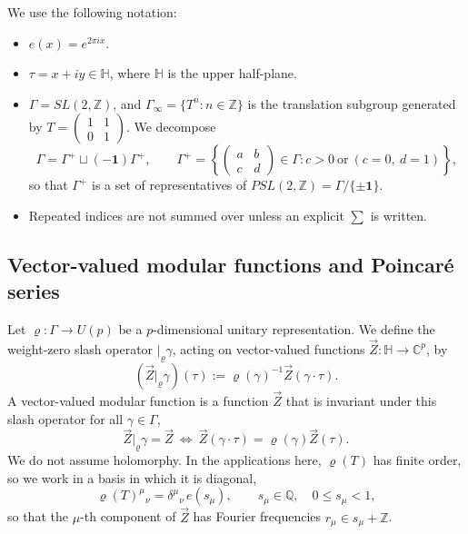 \documentclass[11pt]{article}
\numberwithin{equation}{section}
\begin{document}
We use the following notation:
\begin{itemize}
  \item $e(x)=e^{2\pi ix}$.
  \item $\tau=x+iy\in\mathbb H$, where $\mathbb H$ is the upper half-plane.
  \item $\Gamma=SL(2,\mathbb Z)$, and $\Gamma_\infty=\{T^n:n\in\mathbb Z\}$ is the
  translation subgroup generated by
  $T=\left(\begin{smallmatrix}1&1\\0&1\end{smallmatrix}\right)$. We decompose
  \begin{equation}
    \Gamma=\Gamma^+\sqcup(-\mathbf 1)\Gamma^+,\qquad
    \Gamma^+=\left\{\begin{pmatrix}a&b\\c&d\end{pmatrix}\in\Gamma:
    c>0\ \text{or}\ (c=0,\ d=1)\right\},
  \end{equation}
  so that $\Gamma^+$ is a set of representatives of
  $PSL(2,\mathbb Z)=\Gamma/\{\pm\mathbf 1\}$.
  \item Repeated indices are not summed over unless an explicit $\sum$ is written.
\end{itemize}






\subsection{Vector-valued modular functions and Poincar\'e series}
\label{app:VVMF}

Let $\varrho:\Gamma\to U(p)$ be a $p$-dimensional unitary representation. We define the
weight-zero slash operator $|_\varrho\gamma$, acting on vector-valued functions
$\vec Z:\mathbb H\to\mathbb C^p$, by
\begin{equation}
  (\vec Z|_\varrho\gamma)(\tau):=\varrho(\gamma)^{-1}\vec Z(\gamma\cdot\tau).
\end{equation}
A vector-valued modular function is a function $\vec Z$ that is invariant under this
slash operator for all $\gamma\in\Gamma$,
\begin{equation}
  \vec Z|_\varrho\gamma=\vec Z
  \ \Longleftrightarrow\
  \vec Z(\gamma\cdot\tau)=\varrho(\gamma)\vec Z(\tau).
\end{equation}
We do not assume holomorphy. In the applications here, $\varrho(T)$ has finite order, so we work in a basis in which it is diagonal,
\begin{equation}
  \varrho(T)^\mu{}_\nu=\delta^\mu{}_\nu\,e(s_\mu),
  \qquad s_\mu\in\mathbb Q,\quad 0\le s_\mu<1,
\end{equation}
so that the $\mu$-th component of $\vec Z$ has Fourier frequencies
$r_\mu\in s_\mu+\mathbb Z$.
\end{document}
